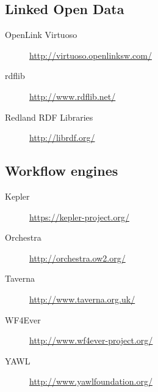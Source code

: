 \documentclass[a4paper]{article}
\begin{document}
\subsection*{Linked Open Data}

\begin{description}
    \item[OpenLink Virtuoso]            \url{http://virtuoso.openlinksw.com/}
    \item[rdflib]                       \url{http://www.rdflib.net/}
    \item[Redland \gls{RDF} Libraries]  \url{http://librdf.org/}
\end{description}

\subsection*{Workflow engines}

\begin{description}
    \item[Kepler]       \url{https://kepler-project.org/}
    \item[Orchestra]    \url{http://orchestra.ow2.org/}
    \item[Taverna]      \url{http://www.taverna.org.uk/}
    \item[WF4Ever]      \url{http://www.wf4ever-project.org/}
    \item[\gls{YAWL}]   \url{http://www.yawlfoundation.org/}
\end{description}

\printglossaries
\end{document}
